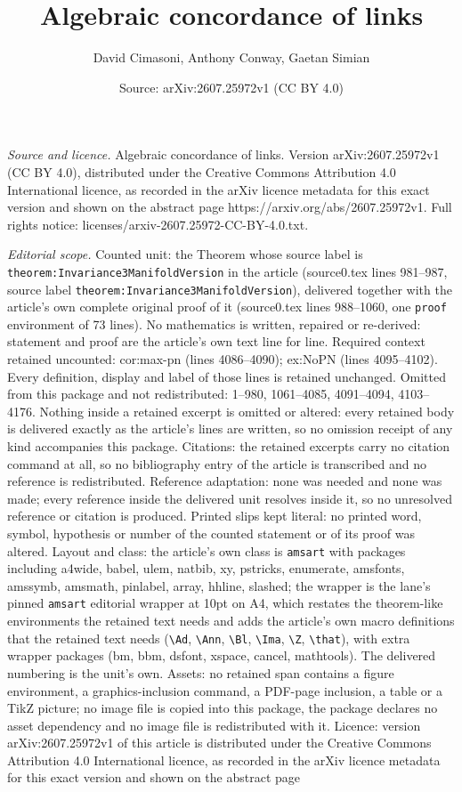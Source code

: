 \documentclass[10pt,a4paper]{amsart}
\title[Algebraic concordance of links]{Algebraic concordance of links}
\author{David Cimasoni, Anthony Conway, Gaetan Simian}
\date{Source: arXiv:2607.25972v1 (CC BY 4.0)}
\begin{document}
\maketitle

\noindent\emph{Source and licence.} Algebraic concordance of links. Version arXiv:2607.25972v1 (CC BY 4.0), distributed under the Creative Commons Attribution 4.0 International licence, as recorded in the arXiv licence metadata for this exact version and shown on the abstract page https://arxiv.org/abs/2607.25972v1. Full rights notice: licenses/arxiv-2607.25972-CC-BY-4.0.txt.\par\smallskip

\noindent\textit{Editorial scope.} Counted unit: the Theorem whose source label is \texttt{theorem:Invariance3ManifoldVersion} in the article (source0.tex lines 981--987, source label \texttt{theorem:Invariance3ManifoldVersion}), delivered together with the article's own complete original proof of it (source0.tex lines 988--1060, one \texttt{proof} environment of 73 lines). No mathematics is written, repaired or re-derived: statement and proof are the article's own text line for line. Required context retained uncounted: cor:max-pn (lines 4086--4090); ex:NoPN (lines 4095--4102). Every definition, display and label of those lines is retained unchanged. Omitted from this package and not redistributed: 1--980, 1061--4085, 4091--4094, 4103--4176. Nothing inside a retained excerpt is omitted or altered: every retained body is delivered exactly as the article's lines are written, so no omission receipt of any kind accompanies this package. Citations: the retained excerpts carry no citation command at all, so no bibliography entry of the article is transcribed and no reference is redistributed. Reference adaptation: none was needed and none was made; every reference inside the delivered unit resolves inside it, so no unresolved reference or citation is produced. Printed slips kept literal: no printed word, symbol, hypothesis or number of the counted statement or of its proof was altered. Layout and class: the article's own class is \texttt{amsart} with packages including a4wide, babel, ulem, natbib, xy, pstricks, enumerate, amsfonts, amssymb, amsmath, pinlabel, array, hhline, slashed; the wrapper is the lane's pinned \texttt{amsart} editorial wrapper at 10pt on A4, which restates the theorem-like environments the retained text needs and adds the article's own macro definitions that the retained text needs (\texttt{\textbackslash Ad}, \texttt{\textbackslash Ann}, \texttt{\textbackslash Bl}, \texttt{\textbackslash Ima}, \texttt{\textbackslash Z}, \texttt{\textbackslash that}), with extra wrapper packages (bm, bbm, dsfont, xspace, cancel, mathtools). The delivered numbering is the unit's own. Assets: no retained span contains a figure environment, a graphics-inclusion command, a PDF-page inclusion, a table or a TikZ picture; no image file is copied into this package, the package declares no asset dependency and no image file is redistributed with it. Licence: version arXiv:2607.25972v1 of this article is distributed under the Creative Commons Attribution 4.0 International licence, as recorded in the arXiv licence metadata for this exact version and shown on the abstract page 
\end{document}
